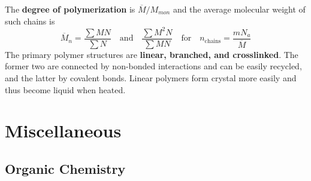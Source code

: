 \documentclass{tufte-book}
\renewcommand{\emph}[1]{\textbf{#1}}
\begin{document}
\bigskip
The \emph{degree of polymerization} is $\overline M / M_{mon}$ and the average molecular weight of such chains is
\begin{equation}
  \overline M_n = \frac{\sum MN}{\sum N} \quad\text{and}\quad \frac{\sum M^2 N}{\sum MN} \quad\text{for}\quad n_{\mathrm{chains}} = \frac{m N_a}{\overline M}
\end{equation}
The primary polymer structures are \emph{linear, branched, and crosslinked}. The former two are connected by non-bonded interactions and can be easily recycled, and the latter by covalent bonds. Linear polymers form crystal more easily and thus become liquid when heated.

\chapter{Miscellaneous}

\section{Organic Chemistry}
\end{document}
